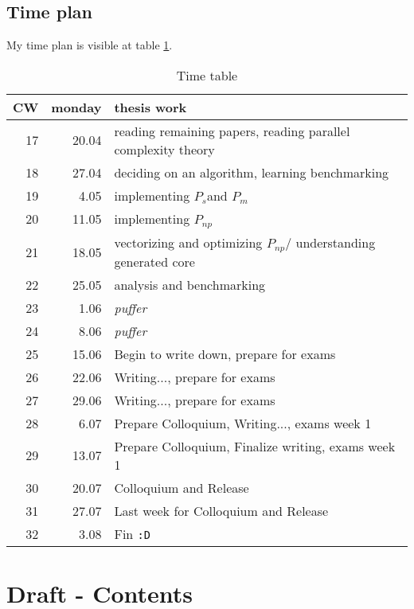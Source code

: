\documentclass{article}
\newcommand{\seq}[0]{$P_{s}$}
\renewcommand{\mp}[0]{$P_{m}$}
\newcommand{\ndp}[0]{$P_{np}$}
\begin{document}
    \subsection{Time plan}
    My time plan is visible at table \ref{timetable}.
    \begin{table}[h]
        \begin{center}
        \caption{Time table} %
        \label{timetable}
        \begin{tabular}{rrl}
            \toprule
            CW & monday & thesis work \\
            \midrule
            17 & 20.04 & reading remaining papers, reading parallel complexity theory \\
            18 & 27.04 & deciding on an algorithm, learning benchmarking  \\
            19 & 4.05  & implementing \seq and \mp \\
            20 & 11.05 & implementing \ndp \\
            21 & 18.05 & vectorizing and optimizing \ndp / understanding generated core \\
            22 & 25.05 & analysis and benchmarking \\
            23 & 1.06  & \textit{puffer} \\
            24 & 8.06  & \textit{puffer} \\
            25 & 15.06 & Begin to write down, prepare for exams\\
            26 & 22.06 & Writing..., prepare for exams \\
            27 & 29.06 & Writing..., prepare for exams \\
            28 & 6.07  & Prepare Colloquium, Writing..., exams week 1 \\
            29 & 13.07 & Prepare Colloquium, Finalize writing, exams week 1 \\
            30 & 20.07 & Colloquium and Release \\
            31 & 27.07 & Last week for Colloquium and Release \\
            32 & 3.08  & Fin \texttt{:D} \\
        \end{tabular}
        \end{center}
    \end{table}
    
    \section{Draft - Contents}
    
\end{document}
